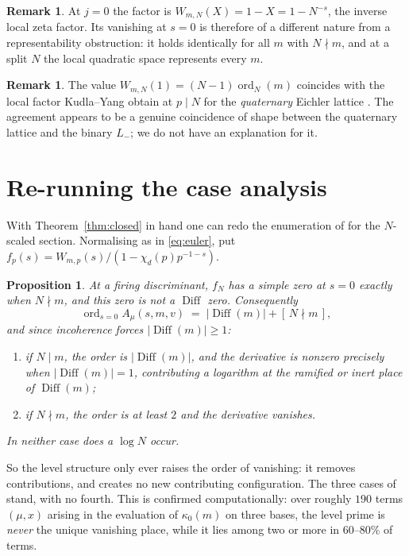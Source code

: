 \documentclass[11pt,reqno]{amsart}
\theoremstyle{plain}
\newtheorem{proposition}[theorem]{Proposition}
\theoremstyle{definition}
\newtheorem{remark}[theorem]{Remark}
\DeclareMathOperator{\Diff}{Diff}
\DeclareMathOperator{\ord}{ord}
\newcommand{\Lm}{L_{-}}
\begin{document}
\begin{remark}
At $j=0$ the factor is $W_{m,N}(X)=1-X=1-N^{-s}$, the inverse local zeta factor. Its vanishing at
$s=0$ is therefore of a different nature from a representability obstruction: it holds identically
for all $m$ with $N\nmid m$, and at a split $N$ the local quadratic space represents every $m$.
\end{remark}

\begin{remark}
The value $W_{m,N}(1)=(N-1)\ord_N(m)$ coincides with the local factor Kudla--Yang obtain at $p\mid N$
for the \emph{quaternary} Eichler lattice \cite[(9.1)]{KY}. The agreement appears to be a genuine
coincidence of shape between the quaternary lattice and the binary $\Lm$; we do not have an
explanation for it.
\end{remark}

\section{Re-running the case analysis}\label{sec:reenum}

With Theorem~\ref{thm:closed} in hand one can redo the enumeration of \cite[Prop.~2.8]{KRY} for the
$N$-scaled section. Normalising as in \eqref{eq:euler}, put
$f_p(s)=W_{m,p}(s)/(1-\chi_d(p)p^{-1-s})$.

\begin{proposition}\label{prop:reenum}
At a firing discriminant, $f_N$ has a simple zero at $s=0$ exactly when $N\nmid m$, and this zero is
not a $\Diff$ zero. Consequently
\[
  \ord_{s=0}A_\mu(s,m,v)\;=\;\lvert\Diff(m)\rvert+[\,N\nmid m\,],
\]
and since incoherence forces $\lvert\Diff(m)\rvert\ge 1$:
\begin{enumerate}
\item if $N\mid m$, the order is $\lvert\Diff(m)\rvert$, and the derivative is nonzero precisely when
      $\lvert\Diff(m)\rvert=1$, contributing a logarithm at the ramified or inert place of $\Diff(m)$;
\item if $N\nmid m$, the order is at least $2$ and the derivative vanishes.
\end{enumerate}
In neither case does a $\log N$ occur.
\end{proposition}

So the level structure only ever raises the order of vanishing: it removes contributions, and
creates no new contributing configuration. The three cases of \cite[Prop.~2.8]{KRY} stand, with no
fourth. This is confirmed computationally: over roughly $190$ terms $(\mu,x)$ arising in the
evaluation of $\kappa_0(m)$ on three bases, the level prime is \emph{never} the unique vanishing
place, while it lies among two or more in $60$--$80\%$ of terms.
\end{document}
